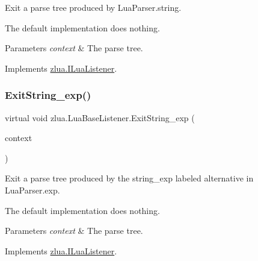 Exit a parse tree produced by Lua\+Parser.\+string. 

The default implementation does nothing.


\begin{DoxyParams}{Parameters}
{\em context} & The parse tree.\\
\hline
\end{DoxyParams}


Implements \mbox{\hyperlink{interfacezlua_1_1_i_lua_listener_afc8e259f5d8629fd2fd800f847dd62a6}{zlua.\+I\+Lua\+Listener}}.

\mbox{\label{classzlua_1_1_lua_base_listener_ac4f5a6a5139a8c670bb8f075a8fc3782}} 
\subsubsection{\texorpdfstring{Exit\+String\+\_\+exp()}{ExitString\_exp()}}
{\footnotesize\ttfamily virtual void zlua.\+Lua\+Base\+Listener.\+Exit\+String\+\_\+exp (\begin{DoxyParamCaption}\item[{\mbox{[}\+Not\+Null\mbox{]} \mbox{\hyperlink{classzlua_1_1_lua_parser_1_1_string__exp_context}{Lua\+Parser.\+String\+\_\+exp\+Context}}}]{context }\end{DoxyParamCaption})\hspace{0.3cm}{\ttfamily [virtual]}}



Exit a parse tree produced by the {\ttfamily string\+\_\+exp} labeled alternative in Lua\+Parser.\+exp. 

The default implementation does nothing.


\begin{DoxyParams}{Parameters}
{\em context} & The parse tree.\\
\hline
\end{DoxyParams}


Implements \mbox{\hyperlink{interfacezlua_1_1_i_lua_listener_adaa28943f1961d32164acc489c86f308}{zlua.\+I\+Lua\+Listener}}.

\mbox{\label{classzlua_1_1_lua_base_listener_ac8f2cae2546480b3e82b85cd55a7258e}} 
